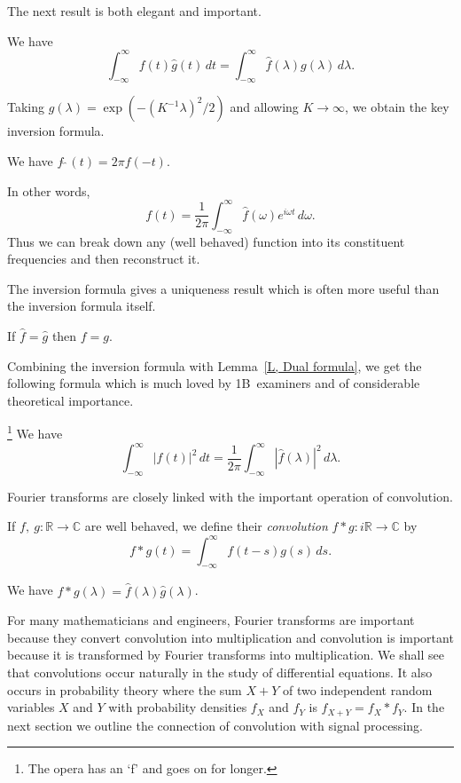 The next result is both elegant and important.
\begin{lemma}\label{L, Dual formula} 
We have
\[\int_{-\infty}^{\infty}f(t)\hat{g}(t)\,dt
=\int_{-\infty}^{\infty}\hat{f}(\lambda)g(\lambda)\,d\lambda.\]  
\end{lemma}
Taking $g(\lambda)=\exp(-(K^{-1}\lambda)^{2}/2)$ 
and allowing $K\rightarrow\infty$,
we obtain the key inversion formula.
\begin{theorem}
We have $f\hat{\ }\hat{\ }(t)=2\pi f(-t)$.
\end{theorem}
In other words,
\[f(t)=\frac{1}{2\pi}
\int_{-\infty}^{\infty}\hat{f}(\omega)e^{i\omega t}\,d\omega.\] 
Thus we can break down any (well behaved) function
into its constituent frequencies and then reconstruct it.

The inversion formula gives a uniqueness result which
is often more useful than the inversion formula itself.
\begin{theorem}[Uniqueness] If $\hat{f}=\hat{g}$ then
$f=g$.
\end{theorem}

Combining the inversion formula with Lemma~\ref{L, Dual formula},
we get the following formula which is much loved by
1B~examiners and of considerable theoretical importance.
\begin{lemma}\footnote{The opera has
an `f' and goes on for longer.} We have
\[\int_{-\infty}^{\infty}|f(t)|^{2}\,dt
=\frac{1}{2\pi}\int_{-\infty}^{\infty}|\hat{f}(\lambda)|^{2}\,d\lambda.\]
\end{lemma}

Fourier transforms are closely linked with the
important operation of convolution.
\begin{definition} If $f,\ g:{\mathbb R}\rightarrow{\mathbb C}$
are well behaved, we define their \emph{convolution}
$f*g:i{\mathbb R}\rightarrow{\mathbb C}$ by
\[f*g(t)=\int_{-\infty}^{\infty}f(t-s)g(s)\,ds.\]
\end{definition}
\begin{lemma} We have 
$\widehat{f*g}(\lambda)=\hat{f}(\lambda)\hat{g}(\lambda)$.
\end{lemma}
For many mathematicians and engineers, Fourier transforms are
important because they convert convolution into multiplication
and convolution is important because it is transformed
by Fourier transforms into multiplication.
We shall see that convolutions occur naturally in the
study of differential equations.
It also occurs in probability theory where the sum $X+Y$
of two independent random variables $X$ and $Y$ with
probability densities $f_{X}$ and $f_{Y}$ is
$f_{X+Y}=f_{X}*f_{Y}$. In the next section
we outline the connection of convolution with signal
processing.
